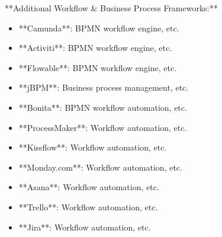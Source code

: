 \documentclass[11pt,a4paper]{article}
\begin{document}
**Additional Workflow \& Business Process Frameworks:**

\begin{itemize}
\item **Camunda**: BPMN workflow engine, etc.
\end{itemize}

\begin{itemize}
\item **Activiti**: BPMN workflow engine, etc.
\end{itemize}

\begin{itemize}
\item **Flowable**: BPMN workflow engine, etc.
\end{itemize}

\begin{itemize}
\item **jBPM**: Business process management, etc.
\end{itemize}

\begin{itemize}
\item **Bonita**: BPMN workflow automation, etc.
\end{itemize}

\begin{itemize}
\item **ProcessMaker**: Workflow automation, etc.
\end{itemize}

\begin{itemize}
\item **Kissflow**: Workflow automation, etc.
\end{itemize}

\begin{itemize}
\item **Monday.com**: Workflow automation, etc.
\end{itemize}

\begin{itemize}
\item **Asana**: Workflow automation, etc.
\end{itemize}

\begin{itemize}
\item **Trello**: Workflow automation, etc.
\end{itemize}

\begin{itemize}
\item **Jira**: Workflow automation, etc.
\end{itemize}
\end{document}
